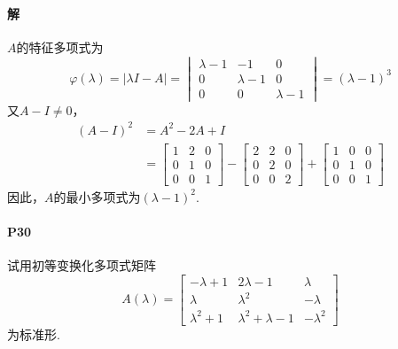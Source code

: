 \documentclass[12pt, a4paper, oneside, fontset=none]{ctexart}
\begin{document}
\paragraph*{解} $A$的特征多项式为
\[
    \varphi(\lambda) = |\lambda I - A| = \begin{vmatrix}
        \lambda - 1 & -1          & 0           \\
        0           & \lambda - 1 & 0           \\
        0           & 0           & \lambda - 1
    \end{vmatrix} = (\lambda - 1)^3
\]
又$A - I \neq 0$，
\begin{align*}
    (A - I)^2 & = A^2 - 2A + I                                   \\
              & = \begin{bmatrix}
                      1 & 2 & 0 \\
                      0 & 1 & 0 \\
                      0 & 0 & 1
                  \end{bmatrix} - \begin{bmatrix}
                                      2 & 2 & 0 \\
                                      0 & 2 & 0 \\
                                      0 & 0 & 2
                                  \end{bmatrix} + \begin{bmatrix}
                                                      1 & 0 & 0 \\
                                                      0 & 1 & 0 \\
                                                      0 & 0 & 1
                                                  \end{bmatrix}
\end{align*}
因此，$A$的最小多项式为$(\lambda - 1)^2.$

\paragraph*{P30} 试用初等变换化多项式矩阵
\begin{equation*}
    A(\lambda) = \begin{bmatrix}
        -\lambda + 1  & 2 \lambda - 1           & \lambda    \\
        \lambda       & \lambda^2               & -\lambda   \\
        \lambda^2 + 1 & \lambda^2 + \lambda - 1 & -\lambda^2
    \end{bmatrix}
\end{equation*}
为标准形.
\end{document}
